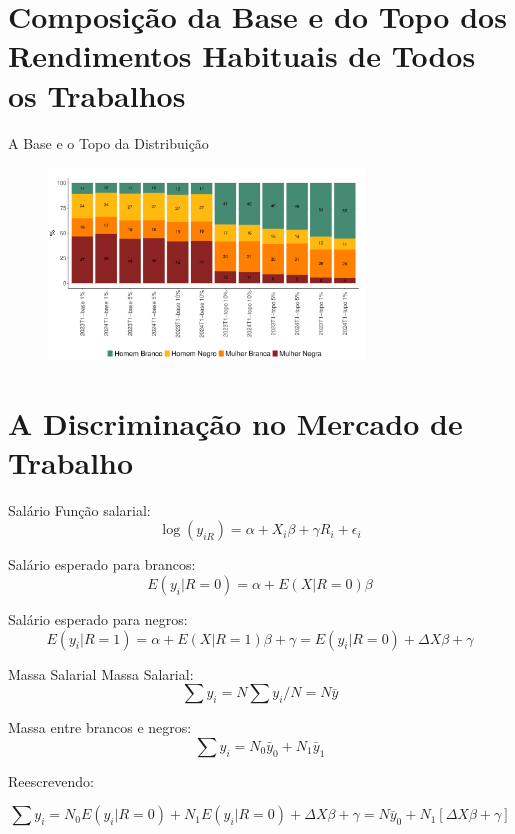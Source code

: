 \documentclass[10pt, xcolor=x11names,compress]{beamer}
\begin{document}
	\section{Composição da Base e do Topo dos Rendimentos Habituais de Todos os Trabalhos}
	\begin{frame}{A Base e o Topo da Distribuição}
		\begin{figure}
			\centering
			\includegraphics[width = 0.75\textwidth]{../figures_output/top_bottom.pdf}
		\end{figure}
	\end{frame}
	
\section{A Discriminação no Mercado de Trabalho}

\begin{frame}{Salário}
	Função salarial:
	\begin{equation}
		\log(y_{iR}) = \alpha + X_{i}\beta + \gamma R_{i} + \epsilon_{i}
	\end{equation}
	
	Salário esperado para brancos:
	\begin{equation}
		E(y_{i}|R=0) = \alpha + E(X|R=0)\beta
	\end{equation}
	
	Salário esperado para negros:
	\begin{equation}
		E(y_{i}|R=1) = \alpha + E(X|R=1)\beta + \gamma = E(y_{i}|R=0) + \Delta X\beta + \gamma
	\end{equation}
\end{frame}

\begin{frame}{Massa Salarial}
	Massa Salarial:
	\begin{equation}
		\sum y_{i} = N \sum y_{i}/N = N \bar{y}
	\end{equation}
	
	Massa entre brancos e negros:
	\begin{equation}
		\sum y_{i} = N_{0} \bar{y}_{0} + N_{1} \bar{y}_{1}
	\end{equation}
	
	Reescrevendo:
	
	\begin{equation}
		\sum y_{i} = N_{0} E(y_{i}|R=0)  + N_{1} E(y_{i}|R=0)  + \Delta X\beta + \gamma =
		N \bar{y}_{0} + N_{1}[\Delta X\beta + \gamma]
	\end{equation}
	
\end{frame}
\end{document}
